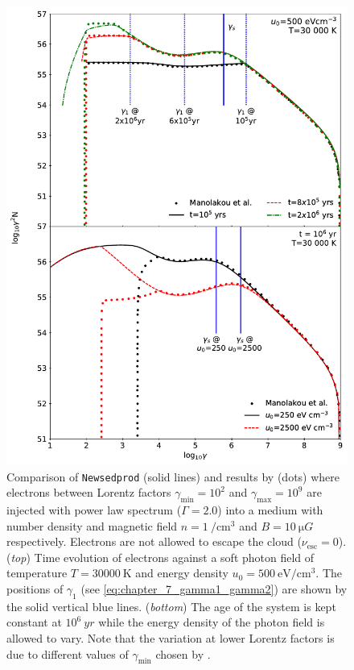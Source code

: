 \begin{figure}[hbtp]
    \centering
    \includegraphics[width=\textwidth]{07_Particle_Evolution/Images/Code/manolakou_verification.pdf}
    \caption{Comparison of {\tt Newsedprod} (solid lines) and results by \cite{2007A&A...474..689M} (dots) where electrons between Lorentz factors $\gamma_\text{min}=10^2$ and $\gamma_\text{max}=10^9$ are injected with power law spectrum ($\Gamma =2.0$) into a medium with number density and magnetic field $n=1~\si{\per\centi\meter\cubed}$ and $B=10~\si{\micro G}$ respectively. Electrons are not allowed to escape the cloud ($\nu_\text{esc}=0$). (\textit{top}) Time evolution of electrons against a soft photon field of temperature $T=30000~\si{\kelvin}$ and energy density $u_0=500~\si{\electronvolt\per\centi\meter\cubed}$.  The positions of $\gamma_1$ (see \autoref{eq:chapter_7_gamma1_gamma2}) are shown by the solid vertical blue lines. (\textit{bottom}) The age of the system is kept constant at $10^6~\si{yr}$ while the energy density of the photon field is allowed to vary. Note that the variation at lower Lorentz factors is due to different values of $\gamma_\text{min}$ chosen by \cite{2007A&A...474..689M}.}
    \label{fig:chapter_7_manolakou_verification}
\end{figure}

